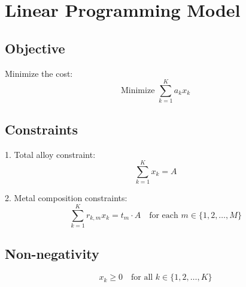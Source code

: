 \documentclass{article}
\begin{document}
\section*{Linear Programming Model}

\subsection*{Objective}
Minimize the cost:
\begin{equation}
\text{Minimize } \sum_{k=1}^K a_k x_k
\end{equation}

\subsection*{Constraints}
1. Total alloy constraint:
\begin{equation}
\sum_{k=1}^K x_k = A
\end{equation}

2. Metal composition constraints:
\begin{equation}
\sum_{k=1}^K r_{k,m} x_k = t_m \cdot A \quad \text{for each } m \in \{1, 2, \ldots, M\}
\end{equation}

\subsection*{Non-negativity}
\begin{equation}
x_k \geq 0 \quad \text{for all } k \in \{1, 2, \ldots, K\}
\end{equation}
\end{document}
